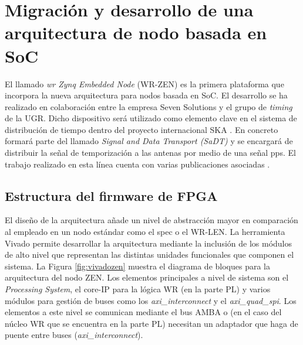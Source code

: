 \section{Migración y desarrollo de una arquitectura de nodo basada en SoC}

El llamado \textit{\acrlong{wr} Zynq Embedded Node} (WR-ZEN) es la primera 
plataforma que incorpora la nueva arquitectura para nodos basada en SoC. El 
desarrollo se ha realizado en colaboración entre la empresa Seven Solutions y 
el grupo de \textit{timing} de la UGR. Dicho dispositivo será utilizado como 
elemento clave en el sistema de distribución de tiempo dentro del proyecto 
internacional SKA \cite{website:ska}. En concreto formará parte del llamado 
\textit{Signal and Data Transport (SaDT)} y se encargará de distribuir la señal 
de temporización a las antenas por medio de una señal \gls{pps}. El trabajo 
realizado en esta línea cuenta con varias publicaciones asociadas 
\cite{klyone16} \cite{klyone17}.

\subsection{Estructura del firmware de FPGA}

El diseño de la arquitectura añade un nivel de abstracción mayor en comparación 
al empleado en un nodo estándar como el \gls{spec} o el WR-LEN. La herramienta 
Vivado permite desarrollar la arquitectura mediante la inclusión de los módulos 
de alto nivel que representan las distintas unidades funcionales que componen 
el sistema. La Figura \ref*{fig:vivadozen} muestra el diagrama de bloques para 
la arquitectura del nodo ZEN. Los elementos principales a nivel de sistema son 
el \textit{Processing System}, el core-IP para la lógica WR (en la parte PL) y 
varios módulos para gestión de buses como los \textit{axi\_interconnect} y el 
\textit{axi\_quad\_spi}. Los elementos a este nivel se comunican mediante el 
bus 
AMBA o (en el caso del núcleo WR que se encuentra en la parte PL) necesitan un 
adaptador que haga de puente entre buses (\textit{axi\_interconnect}).

